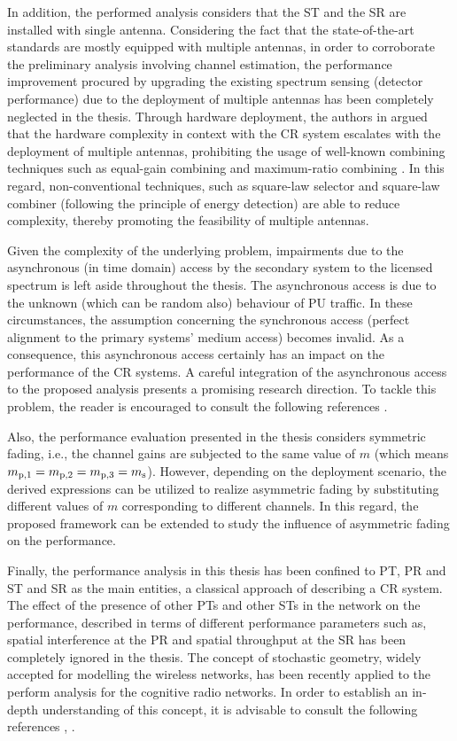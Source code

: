 In addition, the performed analysis considers that the ST and the SR are installed with single antenna. Considering the fact that the state-of-the-art standards are mostly equipped with multiple antennas, in order to corroborate the preliminary analysis involving channel estimation, the performance improvement procured by upgrading the existing spectrum sensing (detector performance) due to the deployment of multiple antennas \cite{Dig07,Tah10} has been completely neglected in the thesis. Through hardware deployment, the authors in  argued that the hardware complexity in context with the CR system escalates with the deployment of multiple antennas, prohibiting the usage of well-known combining techniques such as equal-gain combining and maximum-ratio combining \cite{Alouini03}. In this regard, non-conventional techniques, such as square-law selector and square-law combiner (following the principle of energy detection) are able to reduce complexity, thereby promoting the feasibility of multiple antennas. 

Given the complexity of the underlying problem, impairments due to the asynchronous (in time domain) access by the secondary system to the licensed spectrum is left aside throughout the thesis. The asynchronous access is due to the unknown (which can be random also) behaviour of PU traffic. In these circumstances, the assumption concerning the synchronous access (perfect alignment to the primary systems' medium access) becomes invalid. As a consequence, this asynchronous access certainly has an impact on the performance of the CR systems. A careful integration of the asynchronous access to the proposed analysis presents a promising research direction. To tackle this problem, the reader is encouraged to consult the following references \cite{Jiang13_, Jiang15}.

Also, the performance evaluation presented in the thesis considers symmetric fading, i.e., the channel gains are subjected to the same value of $m$ (which means $m_{\text{p,1}} = m_{\text{p,2}} = m_{\text{p,3}} = m_{\text{s}}$). However, depending on the deployment scenario, the derived expressions can be utilized to realize asymmetric fading \cite{Sura08} by substituting different values of $m$ corresponding to different channels. In this regard, the proposed framework can be extended to study the influence of asymmetric fading on the performance. 

Finally, the performance analysis in this thesis has been confined to PT, PR and ST and SR as the main entities, a classical approach of describing a CR system. The effect of the presence of other PTs and other STs in the network on the performance, described in terms of different performance parameters such as, spatial interference at the PR and spatial throughput at the SR has been completely ignored in the thesis. The concept of stochastic geometry, widely accepted for modelling the wireless networks, has been recently applied to the perform analysis for the cognitive radio networks. In order to establish an in-depth understanding of this concept, it is advisable to consult the following references \cite{Ghasemi08, Lee12, Kusal12, Kusal13, Elsawy13, Song14}, . 

